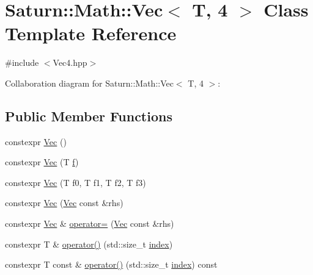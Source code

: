\hypertarget{class_saturn_1_1_math_1_1_vec_3_01_t_00_014_01_4}{}\section{Saturn\+:\+:Math\+:\+:Vec$<$ T, 4 $>$ Class Template Reference}
\label{class_saturn_1_1_math_1_1_vec_3_01_t_00_014_01_4}


{\ttfamily \#include $<$Vec4.\+hpp$>$}



Collaboration diagram for Saturn\+:\+:Math\+:\+:Vec$<$ T, 4 $>$\+:
\subsection*{Public Member Functions}
\begin{DoxyCompactItemize}
\item 
constexpr \mbox{\hyperlink{class_saturn_1_1_math_1_1_vec_3_01_t_00_014_01_4_a6a2660e261781295d6d373a20d345c61}{Vec}} ()
\item 
constexpr \mbox{\hyperlink{class_saturn_1_1_math_1_1_vec_3_01_t_00_014_01_4_af6f94a1d867fe54efb71d7154301447e}{Vec}} (T \mbox{\hyperlink{glad_8h_a6a8efad2e332fcd916bde9e19ddef215}{f}})
\item 
constexpr \mbox{\hyperlink{class_saturn_1_1_math_1_1_vec_3_01_t_00_014_01_4_a13daa8c8c6b27e37546dce035cc13e9e}{Vec}} (T f0, T f1, T f2, T f3)
\item 
constexpr \mbox{\hyperlink{class_saturn_1_1_math_1_1_vec_3_01_t_00_014_01_4_a585f636b6e956baa35363174a4779b3f}{Vec}} (\mbox{\hyperlink{class_saturn_1_1_math_1_1_vec}{Vec}} const \&rhs)
\item 
constexpr \mbox{\hyperlink{class_saturn_1_1_math_1_1_vec}{Vec}} \& \mbox{\hyperlink{class_saturn_1_1_math_1_1_vec_3_01_t_00_014_01_4_a42bfbfee4b30f25a02ba93a427694340}{operator=}} (\mbox{\hyperlink{class_saturn_1_1_math_1_1_vec}{Vec}} const \&rhs)
\item 
constexpr T \& \mbox{\hyperlink{class_saturn_1_1_math_1_1_vec_3_01_t_00_014_01_4_ad136f043bca7603c7132c755442ac9da}{operator()}} (std\+::size\+\_\+t \mbox{\hyperlink{glad_8h_ab47dd9958bcadea08866b42bf358e95e}{index}})
\item 
constexpr T const  \& \mbox{\hyperlink{class_saturn_1_1_math_1_1_vec_3_01_t_00_014_01_4_a3307c89974f686633a3045dd048a61e7}{operator()}} (std\+::size\+\_\+t \mbox{\hyperlink{glad_8h_ab47dd9958bcadea08866b42bf358e95e}{index}}) const
\end{DoxyCompactItemize}
